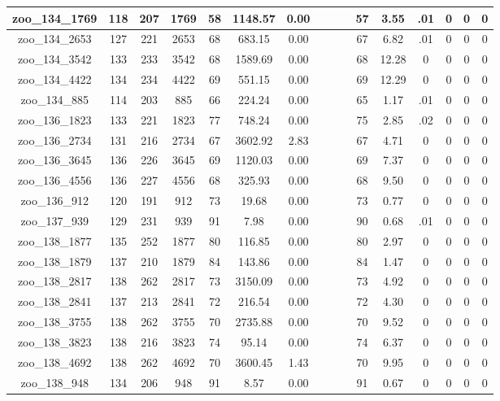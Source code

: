 \begin{landscape}
\begin{longtable}{|c|c|c|c|c|c|c|c|c|c|c|c|c|c|c|c|}
zoo\_134\_1769 & 118 & 207 & 1769 & 58 & 1148.57 & 0.00 &  &  &  & 57 & 3.55 & .01 & 0 & 0 & 0 \\ \hline 
zoo\_134\_2653 & 127 & 221 & 2653 & 68 & 683.15 & 0.00 &  &  &  & 67 & 6.82 & .01 & 0 & 0 & 0 \\ \hline 
zoo\_134\_3542 & 133 & 233 & 3542 & 68 & 1589.69 & 0.00 &  &  &  & 68 & 12.28 & 0 & 0 & 0 & 0 \\ \hline 
zoo\_134\_4422 & 134 & 234 & 4422 & 69 & 551.15 & 0.00 &  &  &  & 69 & 12.29 & 0 & 0 & 0 & 0 \\ \hline 
zoo\_134\_885 & 114 & 203 & 885 & 66 & 224.24 & 0.00 &  &  &  & 65 & 1.17 & .01 & 0 & 0 & 0 \\ \hline 
zoo\_136\_1823 & 133 & 221 & 1823 & 77 & 748.24 & 0.00 &  &  &  & 75 & 2.85 & .02 & 0 & 0 & 0 \\ \hline 
zoo\_136\_2734 & 131 & 216 & 2734 & 67 & 3602.92 & 2.83 &  &  &  & 67 & 4.71 & 0 & 0 & 0 & 0 \\ \hline 
zoo\_136\_3645 & 136 & 226 & 3645 & 69 & 1120.03 & 0.00 &  &  &  & 69 & 7.37 & 0 & 0 & 0 & 0 \\ \hline 
zoo\_136\_4556 & 136 & 227 & 4556 & 68 & 325.93 & 0.00 &  &  &  & 68 & 9.50 & 0 & 0 & 0 & 0 \\ \hline 
zoo\_136\_912 & 120 & 191 & 912 & 73 & 19.68 & 0.00 &  &  &  & 73 & 0.77 & 0 & 0 & 0 & 0 \\ \hline 
zoo\_137\_939 & 129 & 231 & 939 & 91 & 7.98 & 0.00 &  &  &  & 90 & 0.68 & .01 & 0 & 0 & 0 \\ \hline 
zoo\_138\_1877 & 135 & 252 & 1877 & 80 & 116.85 & 0.00 &  &  &  & 80 & 2.97 & 0 & 0 & 0 & 0 \\ \hline 
zoo\_138\_1879 & 137 & 210 & 1879 & 84 & 143.86 & 0.00 &  &  &  & 84 & 1.47 & 0 & 0 & 0 & 0 \\ \hline 
zoo\_138\_2817 & 138 & 262 & 2817 & 73 & 3150.09 & 0.00 &  &  &  & 73 & 4.92 & 0 & 0 & 0 & 0 \\ \hline 
zoo\_138\_2841 & 137 & 213 & 2841 & 72 & 216.54 & 0.00 &  &  &  & 72 & 4.30 & 0 & 0 & 0 & 0 \\ \hline 
zoo\_138\_3755 & 138 & 262 & 3755 & 70 & 2735.88 & 0.00 &  &  &  & 70 & 9.52 & 0 & 0 & 0 & 0 \\ \hline 
zoo\_138\_3823 & 138 & 216 & 3823 & 74 & 95.14 & 0.00 &  &  &  & 74 & 6.37 & 0 & 0 & 0 & 0 \\ \hline 
zoo\_138\_4692 & 138 & 262 & 4692 & 70 & 3600.45 & 1.43 &  &  &  & 70 & 9.95 & 0 & 0 & 0 & 0 \\ \hline 
zoo\_138\_948 & 134 & 206 & 948 & 91 & 8.57 & 0.00 &  &  &  & 91 & 0.67 & 0 & 0 & 0 & 0 \\ \hline 

\end{longtable}
\end{landscape}
